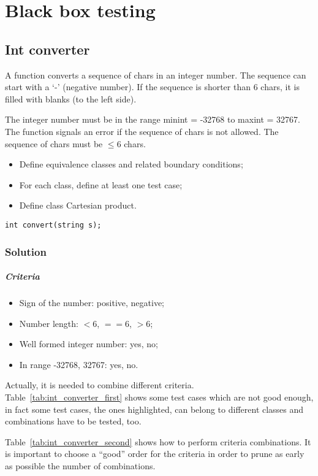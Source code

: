 \chapter{Black box testing}
\section{Int converter}
A function converts a sequence of chars in an integer number. The sequence can start with a `-' (negative number). If the sequence is shorter than 6 chars, it is filled with blanks (to the left side).

The integer number must be in the range minint = -32768 to maxint = 32767. The function signals an error if the sequence of chars is not allowed. The sequence of chars must be $\le 6$ chars.

\begin{itemize}
\item Define equivalence classes and related boundary conditions;
\item For each class, define at least one test case;
\item Define class Cartesian product. 
\end{itemize}
\texttt{int convert(string s);}

\subsection{Solution}
\paragraph{Criteria}
\begin{itemize}
\item Sign of the number: positive, negative;
\item Number length: $< 6$, $== 6$, $> 6$;
\item Well formed integer number: yes, no;
\item In range -32768, 32767: yes, no.
\end{itemize}
Actually, it is needed to combine different criteria. Table~\ref{tab:int_converter_first} shows some test cases which are not good enough, in fact some test cases, the ones highlighted, can belong to different classes and combinations have to be tested, too.

Table~\ref{tab:int_converter_second} shows how to perform criteria combinations. It is important to choose a ``good'' order for the criteria in order to prune as early as possible the number of combinations.

